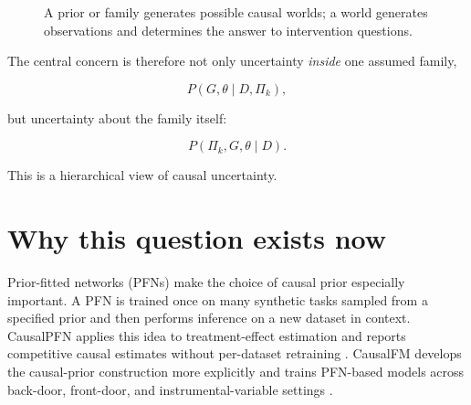 \documentclass[11pt]{article}
\begin{document}
\begin{figure}[h]
\centering
{}
\caption{A prior or family generates possible causal worlds; a world generates observations and determines the answer to intervention questions.}
\end{figure}

The central concern is therefore not only uncertainty \emph{inside} one assumed family,

\begin{equation}
P(G,\theta\mid D,\Pi_k),
\end{equation}

but uncertainty about the family itself:

\begin{equation}
P(\Pi_k,G,\theta\mid D).
\end{equation}

This is a hierarchical view of causal uncertainty.

\section{Why this question exists now}

Prior-fitted networks (PFNs) make the choice of causal prior especially important. A PFN is trained once on many synthetic tasks sampled from a specified prior and then performs inference on a new dataset in context. CausalPFN applies this idea to treatment-effect estimation and reports competitive causal estimates without per-dataset retraining \cite{balazadeh2025}. CausalFM develops the causal-prior construction more explicitly and trains PFN-based models across back-door, front-door, and instrumental-variable settings \cite{ma2026}.
\end{document}
